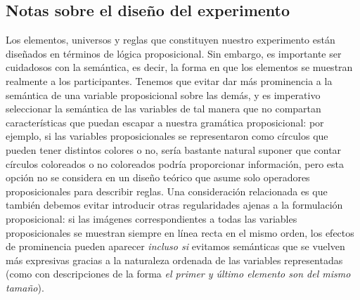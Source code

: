 \subsection{Notas sobre el diseño del experimento}\label{Experiment_design}


Los elementos, universos y reglas que constituyen nuestro experimento están diseñados en términos de lógica proposicional. Sin embargo, es importante ser cuidadosos con la semántica, es decir, la forma en que los elementos se muestran realmente a los participantes. Tenemos que evitar dar más prominencia a la semántica de una variable proposicional sobre las demás, y es imperativo seleccionar la semántica de las variables de tal manera que no compartan características que puedan escapar a nuestra gramática proposicional: por ejemplo, si las variables proposicionales se representaron como círculos que pueden tener distintos colores o no, sería bastante natural suponer que contar círculos coloreados o no coloreados podría proporcionar información, pero esta opción no se considera en un diseño teórico que asume solo operadores proposicionales para describir reglas. Una consideración relacionada es que también debemos evitar introducir otras regularidades ajenas a la formulación proposicional: si las imágenes correspondientes a todas las variables proposicionales se muestran siempre en línea recta en el mismo orden, los efectos de prominencia pueden aparecer \textit{incluso si} evitamos semánticas que se vuelven más expresivas gracias a la naturaleza ordenada de las variables representadas (como con descripciones de la forma \textit{el primer y último elemento son del mismo tamaño}).


